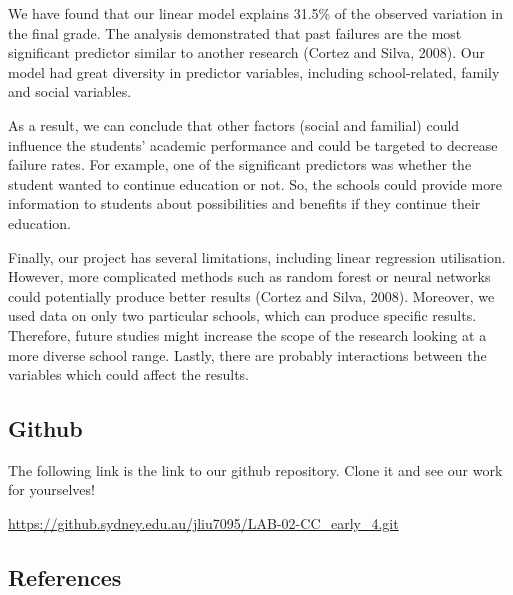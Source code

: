 \documentclass[letterpaper,9pt,twocolumn,twoside,]{pinp}
\begin{document}
We have found that our linear model explains 31.5\% of the observed
variation in the final grade. The analysis demonstrated that past
failures are the most significant predictor similar to another research
(Cortez and Silva, 2008). Our model had great diversity in predictor
variables, including school-related, family and social variables.
\linebreak

As a result, we can conclude that other factors (social and familial)
could influence the students' academic performance and could be targeted
to decrease failure rates. For example, one of the significant
predictors was whether the student wanted to continue education or not.
So, the schools could provide more information to students about
possibilities and benefits if they continue their education. \linebreak

Finally, our project has several limitations, including linear
regression utilisation. However, more complicated methods such as random
forest or neural networks could potentially produce better results
(Cortez and Silva, 2008). Moreover, we used data on only two particular
schools, which can produce specific results. Therefore, future studies
might increase the scope of the research looking at a more diverse
school range. Lastly, there are probably interactions between the
variables which could affect the results.\linebreak

\hypertarget{github}{%
\subsection{Github}\label{github}}

The following link is the link to our github repository. Clone it and
see our work for yourselves!

\url{https://github.sydney.edu.au/jliu7095/LAB-02-CC_early_4.git}
\linebreak

\hypertarget{references}{%
\subsection{References}\label{references}}

\small
\end{document}

